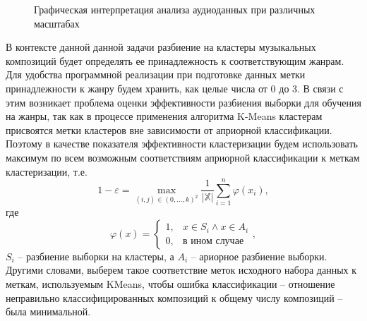 \begin{figure}[H]
	\caption{Графическая интерпретация анализа аудиоданных при различных масштабах}
\label{fig:plot}
\end{figure}

В контексте данной данной задачи разбиение на кластеры музыкальных композиций будет определять ее принадлежность к соответствующим жанрам.
Для удобства программной реализации при подготовке данных метки принадлежности к жанру
будем хранить, как целые числа от 0 до 3. В связи с этим возникает проблема оценки эффективности
разбиения выборки для обучения на жанры, так как в процессе применения алгоритма K-Means кластерам
присвоятся метки кластеров вне зависимости от априорной классификации. Поэтому в качестве показателя эффективности
кластеризации будем использовать максимум по всем возможным соответствиям априорной классификации к меткам кластеризации, т.е.
\begin{equation}
	1 - \varepsilon = \underset{(i,j) \in (0, \dots, k)^2}{\max} \frac{1}{\left|\mathbb{X}\right|}\sum_{i=1}^n \varphi(x_i),
\end{equation}
где
	$$\varphi(x) = 
	\begin{cases}
		1, &  x \in S_i \wedge x \in A_i \\
		0, & \text{в ином случае}
	\end{cases}, $$
	$S_i$ -- разбиение выборки на кластеры, а $A_i$ -- ариорное разбиение выборки.
Другими словами, выберем такое соответствие меток исходного набора данных к меткам, используемым KMeans, чтобы ошибка классификации -- отношение неправильно классифицированных композиций к общему числу композиций -- была минимальной.

